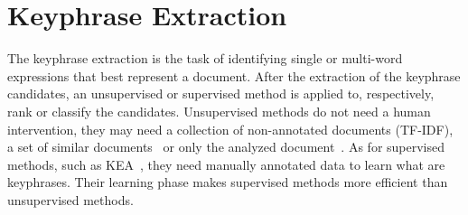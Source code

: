 
\section{Keyphrase Extraction}
\label{sec:keyphrase_extraction}
  The keyphrase extraction is the task of identifying single or multi-word
  expressions that best represent a document. After the extraction of the
  keyphrase candidates, an unsupervised or supervised method is applied to,
  respectively, rank or classify the candidates. Unsupervised methods do not
  need a human intervention, they may need a collection of non-annotated
  documents (TF-IDF), a set of similar
  documents~\cite[ExpandRank]{wan2008expandrank} or only the analyzed
  document~\cite[TopicRank]{bougouin2013topicrank}. As for supervised methods,
  such as KEA~\cite{witten1999kea}, they need manually annotated data to learn
  what are keyphrases. Their learning phase makes supervised methods more
  efficient than unsupervised methods.

